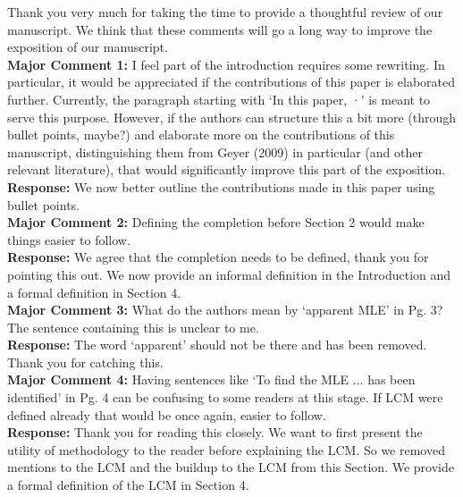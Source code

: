 \documentclass[12pt]{article}
\begin{document}
Thank you very much for taking the time to provide a thoughtful review of our manuscript. We think that these comments will go a long way to improve the exposition of our manuscript. \\


{\bf Major Comment 1:} I feel part of the introduction requires some rewriting. In particular, it would be appreciated if the contributions of this paper is elaborated further. Currently, the paragraph starting with ‘In this paper, ·’ is meant to serve this purpose. However, if the authors can structure this a bit more (through bullet points, maybe?) and elaborate more on the contributions of this manuscript, distinguishing them from Geyer (2009) in particular (and other relevant literature), that would significantly improve this part of the exposition. \\

{\bf Response:} We now better outline the contributions made in this paper using bullet points.  \\



{\bf Major Comment 2:} Defining the completion before Section 2 would make things easier to follow. \\

{\bf Response:} We agree that the completion needs to be defined, thank you for pointing this out. We now provide an informal definition in the Introduction and a formal definition in Section 4. \\



{\bf Major Comment 3:} What do the authors mean by ‘apparent MLE’ in Pg. 3? The sentence containing this is unclear to me. \\

{\bf Response:} The word `apparent' should not be there and has been removed. Thank you for catching this. \\



{\bf Major Comment 4:} Having sentences like ‘To find the MLE ... has been identified’ in Pg. 4 can be confusing to some readers at this stage. If LCM were defined already that would be once again, easier to follow.\\

{\bf Response:} Thank you for reading this closely. We want to first present the utility of methodology to the reader before explaining the LCM. So we removed mentions to the LCM and the buildup to the LCM from this Section. We provide a formal definition of the LCM in Section 4. \\
\end{document}
